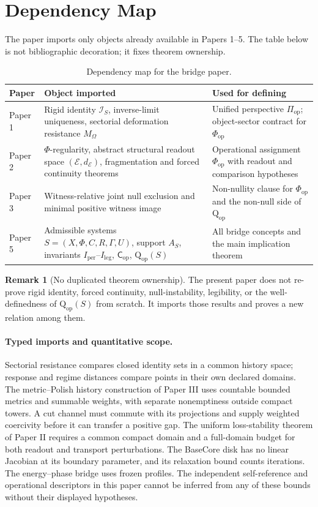 \documentclass[11pt,a4paper]{article}
\theoremstyle{definition}
\newtheorem{remark}[theorem]{Remark}
\newcommand{\Cop}{\mathsf{C}_{\mathrm{op}}}
\newcommand{\Qop}{\mathrm{Q}_{\mathrm{op}}}
\newcommand{\Piop}{\Pi_{\mathrm{op}}}
\newcommand{\Phiop}{\Phi_{\mathrm{op}}}
\newcommand{\Aset}{A_S}
\newcommand{\IdS}{\mathcal{I}_S}
\newcommand{\MO}{M_\Omega}
\newcommand{\Espace}{\mathcal{E}}
\newcommand{\Iper}{I_{\mathrm{per}}}
\newcommand{\Ileg}{I_{\mathrm{leg}}}
\begin{document}
\section{Dependency Map}

The paper imports only objects already available in Papers 1--5. The table below is not bibliographic decoration; it fixes theorem ownership.

\begin{table}[ht]
\centering
\caption{Dependency map for the bridge paper.}
\label{tab:dependency-map}
\begin{tabularx}{\textwidth}{>{\raggedright\arraybackslash}p{2.3cm} Y Y}
\toprule
Paper & Object imported & Used for defining \\
\midrule
Paper 1 & Rigid identity $\IdS$, inverse-limit uniqueness, sectorial deformation resistance $\MO$ & Unified perspective $\Piop$; object-sector contract for $\Phiop$ \\
Paper 2 & $\Phi$-regularity, abstract structural readout space $(\Espace,d_{\Espace})$, fragmentation and forced continuity theorems & Operational assignment $\Phiop$ with readout and comparison hypotheses \\
Paper 3 & Witness-relative joint null exclusion and minimal positive witness image & Non-nullity clause for $\Phiop$ and the non-null side of $\Qop$ \\
Paper 5 & Admissible systems $S=(X,\Phi,C,R,\Gamma,U)$, support $\Aset$, invariants $\Iper$--$\Ileg$, $\Cop$, $\Qop(S)$ & All bridge concepts and the main implication theorem \\
\bottomrule
\end{tabularx}
\end{table}

\begin{remark}[No duplicated theorem ownership]
The present paper does not re-prove rigid identity, forced continuity, null-instability, legibility, or the well-definedness of $\Qop(S)$ from scratch. It imports those results and proves a new relation among them.
\end{remark}

\paragraph{Typed imports and quantitative scope.}
Sectorial resistance compares closed identity sets in a common history space;
response and regime distances compare points in their own declared domains.
The metric--Polish history construction of Paper III uses countable bounded
metrics and summable weights, with separate nonemptiness outside compact
towers. A cut channel must commute with its projections and supply weighted
coercivity before it can transfer a positive gap. The uniform loss-stability
theorem of Paper II requires a common compact domain and a full-domain budget
for both readout and transport perturbations. The BaseCore disk has no linear
Jacobian at its boundary parameter, and its relaxation bound counts iterations.
The energy--phase bridge uses frozen profiles. The independent self-reference
and operational descriptors in this paper cannot be inferred from any of
these bounds without their displayed hypotheses.
\end{document}
